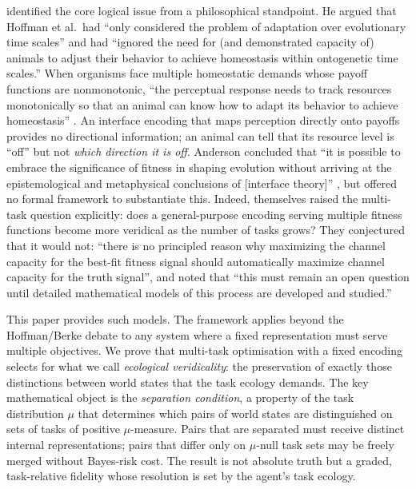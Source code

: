 \documentclass[12pt]{article}
\begin{document}
\citet{anderson_2015} identified the core logical issue from a philosophical standpoint. He argued that Hoffman et al.\ had ``only considered the problem of adaptation over evolutionary time scales'' and had ``ignored the need for (and demonstrated capacity of) animals to adjust their behavior to achieve homeostasis within ontogenetic time scales.'' When organisms face multiple homeostatic demands whose payoff functions are nonmonotonic, ``the perceptual response needs to track resources monotonically so that an animal can know how to adapt its behavior to achieve homeostasis'' \citep[pp.~1508--1509]{anderson_2015}. An interface encoding that maps perception directly onto payoffs provides no directional information; an animal can tell that its resource level is ``off'' but not \emph{which direction it is off}. Anderson concluded that ``it is possible to embrace the significance of fitness in shaping evolution without arriving at the epistemological and metaphysical conclusions of [interface theory]'' \citep[p.~1511]{anderson_2015}, but offered no formal framework to substantiate this. Indeed, \citet[\S8.3]{hoffman_singh_2012} themselves raised the multi-task question explicitly: does a general-purpose encoding serving multiple fitness functions become more veridical as the number of tasks grows? They conjectured that it would not: ``there is no principled reason why maximizing the channel capacity for the best-fit fitness signal should automatically maximize channel capacity for the truth signal'', and noted that ``this must remain an open question until detailed mathematical models of this process are developed and studied.''

This paper provides such models. The framework applies beyond the Hoffman/Berke debate to any system where a fixed representation must serve multiple objectives. We prove that multi-task optimisation with a fixed encoding selects for what we call \emph{ecological veridicality}: the preservation of exactly those distinctions between world states that the task ecology demands. The key mathematical object is the \emph{separation condition}, a property of the task distribution $\mu$ that determines which pairs of world states are distinguished on sets of tasks of positive $\mu$-measure. Pairs that are separated must receive distinct internal representations; pairs that differ only on $\mu$-null task sets may be freely merged without Bayes-risk cost. The result is not absolute truth but a graded, task-relative fidelity whose resolution is set by the agent's task ecology.
\end{document}
